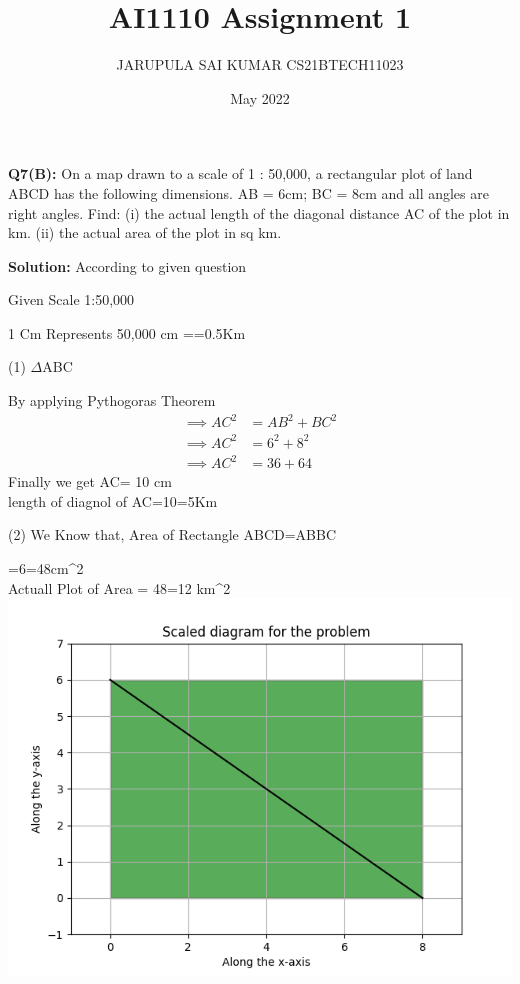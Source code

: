 \documentclass[12pt, twocolumn]{article}
\title{AI1110 Assignment 1}
\author{JARUPULA SAI KUMAR CS21BTECH11023}
\date{May 2022}
\newcommand{\solution}{\noindent \textbf{Solution: }}
\begin{document}
\maketitle
\begin{problem}
\textbf{Q7(B):} On a map drawn to a scale of 1 : 50,000, a rectangular plot of land ABCD has the
following dimensions. AB = 6cm; BC = 8cm and all angles are right angles. Find:
(i) the actual length of the diagonal distance AC of the plot in km.
(ii) the actual area of the plot in sq km.
\end{problem}

\solution 
According to given question

Given Scale 1:50,000

1 Cm Represents 50,000 cm =\cdot{}=0.5Km

\implies(1)  $\Delta{}$ABC 

By applying Pythogoras Theorem
\begin{align}
\implies AC^2 &= AB^2+BC^2\\
\implies AC^2 &= 6^2+8^2\\
\implies AC^2 &=36+64
\end{align}
Finally we get AC= 10 cm\\

\implies length  of diagnol of AC=10=5Km


\implies(2) We Know that,
Area of Rectangle ABCD=AB\cdot BC

=6=48cm^2\\
Actuall Plot of Area = 48=12 km^2\\

\includegraphics[width=\columnwidth]{Figure_1.1.png}
\end{document}
